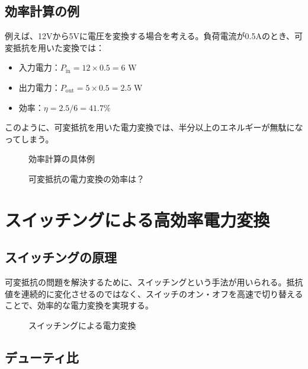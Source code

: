 \subsection{効率計算の例}

例えば、12Vから5Vに電圧を変換する場合を考える。負荷電流が0.5Aのとき、可変抵抗を用いた変換では：

\begin{itemize}
\item 入力電力：$P_{\text{in}} = 12 \times 0.5 = 6$ W
\item 出力電力：$P_{\text{out}} = 5 \times 0.5 = 2.5$ W
\item 効率：$\eta = 2.5/6 = 41.7$\%
\end{itemize}

このように、可変抵抗を用いた電力変換では、半分以上のエネルギーが無駄になってしまう。

\begin{figure}[H]
\centering
{}
\caption{効率計算の具体例}
\label{fig:efficiency_calculation}
\end{figure}

\begin{figure}[H]
\centering
{}
\caption{可変抵抗の電力変換の効率は？}
\label{fig:resistor_efficiency}
\end{figure}

\section{スイッチングによる高効率電力変換}

\subsection{スイッチングの原理}

可変抵抗の問題を解決するために、スイッチングという手法が用いられる。抵抗値を連続的に変化させるのではなく、スイッチのオン・オフを高速で切り替えることで、効率的な電力変換を実現する。

\begin{figure}[H]
\centering
{}
\caption{スイッチングによる電力変換}
\label{fig:switching}
\end{figure}

\subsection{デューティ比}

